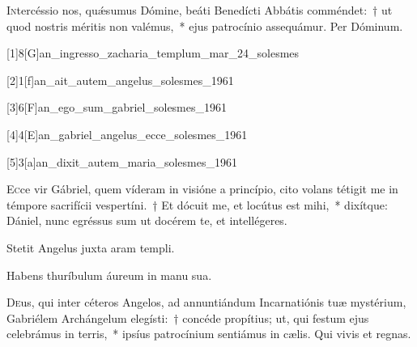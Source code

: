 \documentclass[vesperale_romanum.tex]{subfiles}
\begin{document}
\duplexmajus

\oratio

\lettrine{I}{n}tercéssio nos, quǽsumus Dómine, beáti Benedí\-cti Abbátis comméndet:~† ut quod nostris méritis non valémus,~* ejus patrocínio assequámur. Per Dóminum.

\commferiae

\myrule


\duplexmajus


[1]{8}[G]{an_ingresso_zacharia_templum_mar_24_solesmes}

[2]{1}[f]{an_ait_autem_angelus_solesmes_1961}
 
 [3]{6}[F]{an_ego_sum_gabriel_solesmes_1961}
 
 [4]{4}[E]{an_gabriel_angelus_ecce_solesmes_1961}

[5]{3}[a]{an_dixit_autem_maria_solesmes_1961}


\lettrine{E}{c}ce vir Gábriel, quem víderam in visióne a princípio, cito volans tétigit me in témpore sacrifícii vespertíni.~† Et dócuit me, et locútus est mihi,~* dixítque: Dániel, nunc egréssus sum ut docérem te, et intellégeres.

\hymnus


\vv Stetit Angelus juxta aram templi.

\rr Habens thuríbulum áureum in manu sua.


\oratio

\lettrine{D}{e}us, qui inter céteros Angelos, ad annuntiándum Incarnatiónis tuæ mystérium, Gabriélem Archángelum elegísti:~† concéde propítius; ut, qui festum ejus celebrámus in terris,~* i\-psíus patrocínium sentiámus in cælis. Qui vivis et regnas.
\end{document}
